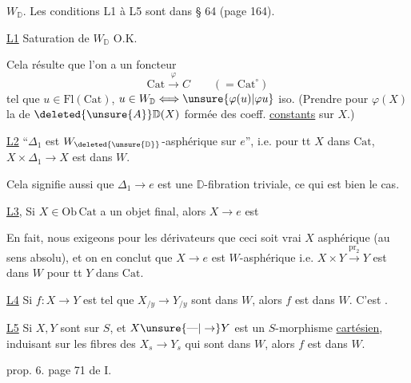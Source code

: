 
$W_{\mathbb D}$. Les conditions L1 à L5 sont 
dans  § 64 (page 164).

\uline{L1} Saturation de $W_{\mathbb D}$ O.K.

 Cela résulte   que l'on  a
un foncteur
\[
\mathrm{Cat}\xrightarrow{\varphi} C\qquad (=\mathrm{Cat}^{\circ})
\]
tel que  $u\in\mathrm{Fl}(\mathrm{Cat})$, $u\in W_{\mathbb D}\Longleftrightarrow\unsure{\varphi(u)|\varphi u}$ iso.
(Prendre pour $\varphi(X)$ la  de
$\deleted{\unsure{A}}\mathbb D(X)$ formée des  coeff. \uline{constants} sur $X$.)

\uline{L2} ``$\mathbb{\Delta}_1$ est $W_{\deleted{\unsure{\mathbb D}}}$-asphérique sur $e$'', i.e. pour tt
$X$ dans $\mathrm{Cat}$, $X\times\mathbb{\Delta}_1\longrightarrow X$ est dans $W$.

Cela signifie aussi que $\mathbb{\Delta}_1\longrightarrow e$ est une $\mathbb D$-fibration
triviale, ce qui est bien le cas.

\uline{L3},  Si $X\in\mathrm{Ob}\,\mathrm{Cat}$ a un
objet final, alors $X\longrightarrow e$ est  

 En fait, nous exigeons pour les dérivateurs
que ceci soit vrai  $X$ asphérique
(au sens absolu),  et on en
conclut  que $X\longrightarrow e$ est $W$-asphérique
i.e. $X\times Y\xrightarrow{\mathrm{pr}_2}Y$ est dans $W$ pour tt $Y$
dans $\mathrm{Cat}$.

\uline{L4} Si $f:X\longrightarrow Y$ est tel que $X_{/y}\longrightarrow Y_{/y}$
sont dans $W$, alors $f$ est dans $W$.
C'est .


\uline{L5} Si $X,Y$ sont  sur $S$, et $X\unsure{\text{---}|\to}Y$ est
un $S$-morphisme \uline{cartésien}, induisant sur les
fibres des $X_s\longrightarrow Y_s$ qui sont dans $W$, alors
$f$ est dans $W$.

  prop. 6. page 71 de $\mathrm I$.

